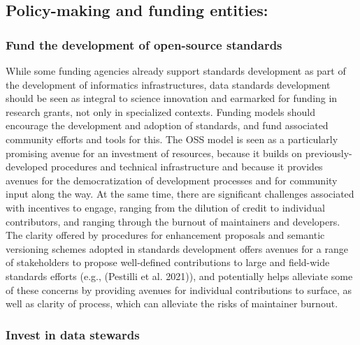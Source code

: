 \documentclass[
  letterpaper,
  DIV=11,
  numbers=noendperiod]{scrartcl}
\begin{document}
\subsection{Policy-making and funding
entities:}\label{policy-making-and-funding-entities}

\subsubsection{Fund the development of open-source
standards}\label{fund-the-development-of-open-source-standards}

While some funding agencies already support standards development as
part of the development of informatics infrastructures, data standards
development should be seen as integral to science innovation and
earmarked for funding in research grants, not only in specialized
contexts. Funding models should encourage the development and adoption
of standards, and fund associated community efforts and tools for this.
The OSS model is seen as a particularly promising avenue for an
investment of resources, because it builds on previously-developed
procedures and technical infrastructure and because it provides avenues
for the democratization of development processes and for community input
along the way. At the same time, there are significant challenges
associated with incentives to engage, ranging from the dilution of
credit to individual contributors, and ranging through the burnout of
maintainers and developers. The clarity offered by procedures for
enhancement proposals and semantic versioning schemes adopted in
standards development offers avenues for a range of stakeholders to
propose well-defined contributions to large and field-wide standards
efforts (e.g., (Pestilli et al. 2021)), and potentially helps alleviate
some of these concerns by providing avenues for individual contributions
to surface, as well as clarity of process, which can alleviate the risks
of maintainer burnout.

\subsubsection{Invest in data stewards}\label{invest-in-data-stewards}
\end{document}
